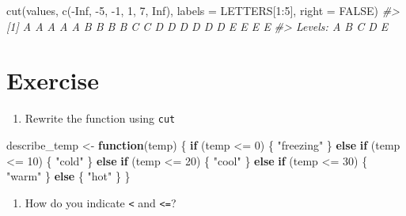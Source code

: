 \documentclass[
]{book}
\newenvironment{Shaded}{\begin{snugshade}}{\end{snugshade}}
\newcommand{\AttributeTok}[1]{\textcolor[rgb]{0.77,0.63,0.00}{#1}}
\newcommand{\CommentTok}[1]{\textcolor[rgb]{0.56,0.35,0.01}{\textit{#1}}}
\newcommand{\ConstantTok}[1]{\textcolor[rgb]{0.00,0.00,0.00}{#1}}
\newcommand{\ControlFlowTok}[1]{\textcolor[rgb]{0.13,0.29,0.53}{\textbf{#1}}}
\newcommand{\DecValTok}[1]{\textcolor[rgb]{0.00,0.00,0.81}{#1}}
\newcommand{\FunctionTok}[1]{\textcolor[rgb]{0.00,0.00,0.00}{#1}}
\newcommand{\NormalTok}[1]{#1}
\newcommand{\OtherTok}[1]{\textcolor[rgb]{0.56,0.35,0.01}{#1}}
\newcommand{\SpecialCharTok}[1]{\textcolor[rgb]{0.00,0.00,0.00}{#1}}
\newcommand{\StringTok}[1]{\textcolor[rgb]{0.31,0.60,0.02}{#1}}
\providecommand{\tightlist}{%
  \setlength{\itemsep}{0pt}\setlength{\parskip}{0pt}}
\begin{document}
\begin{Shaded}
\begin{Highlighting}[]
\FunctionTok{cut}\NormalTok{(values, }\FunctionTok{c}\NormalTok{(}\SpecialCharTok{{-}}\ConstantTok{Inf}\NormalTok{, }\SpecialCharTok{{-}}\DecValTok{5}\NormalTok{, }\SpecialCharTok{{-}}\DecValTok{1}\NormalTok{, }\DecValTok{1}\NormalTok{, }\DecValTok{7}\NormalTok{, }\ConstantTok{Inf}\NormalTok{), }\AttributeTok{labels =}\NormalTok{ LETTERS[}\DecValTok{1}\SpecialCharTok{:}\DecValTok{5}\NormalTok{], }\AttributeTok{right =} \ConstantTok{FALSE}\NormalTok{)}
\CommentTok{\#\textgreater{}  [1] A A A A A B B B B C C D D D D D D E E E E}
\CommentTok{\#\textgreater{} Levels: A B C D E}
\end{Highlighting}
\end{Shaded}

\hypertarget{exercise-1}{%
\section{Exercise}\label{exercise-1}}

\begin{enumerate}
\def\labelenumi{\arabic{enumi}.}
\tightlist
\item
  Rewrite the function using \texttt{cut}
\end{enumerate}

\begin{Shaded}
\begin{Highlighting}[]
\NormalTok{describe\_temp }\OtherTok{\textless{}{-}} \ControlFlowTok{function}\NormalTok{(temp) \{}
  \ControlFlowTok{if}\NormalTok{ (temp }\SpecialCharTok{\textless{}=} \DecValTok{0}\NormalTok{) \{}
    \StringTok{"freezing"}
\NormalTok{  \} }\ControlFlowTok{else} \ControlFlowTok{if}\NormalTok{ (temp }\SpecialCharTok{\textless{}=} \DecValTok{10}\NormalTok{) \{}
    \StringTok{"cold"}
\NormalTok{  \} }\ControlFlowTok{else} \ControlFlowTok{if}\NormalTok{ (temp }\SpecialCharTok{\textless{}=} \DecValTok{20}\NormalTok{) \{}
    \StringTok{"cool"}
\NormalTok{  \} }\ControlFlowTok{else} \ControlFlowTok{if}\NormalTok{ (temp }\SpecialCharTok{\textless{}=} \DecValTok{30}\NormalTok{) \{}
    \StringTok{"warm"}
\NormalTok{  \} }\ControlFlowTok{else}\NormalTok{ \{}
    \StringTok{"hot"}
\NormalTok{  \}}
\NormalTok{\}}
\end{Highlighting}
\end{Shaded}

\begin{enumerate}
\def\labelenumi{\arabic{enumi}.}
\setcounter{enumi}{1}
\tightlist
\item
  How do you indicate \texttt{\textless{}} and \texttt{\textless{}=}?
\end{enumerate}
\end{document}

